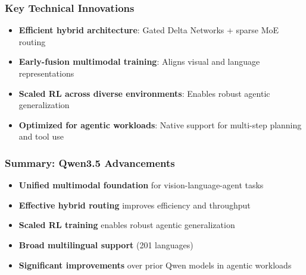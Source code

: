 \begin{frame}

\frametitle{Key Technical Innovations}

\begin{itemize}
\item \textbf{Efficient hybrid architecture}: Gated Delta Networks + sparse MoE routing
\item \textbf{Early-fusion multimodal training}: Aligns visual and language representations
\item \textbf{Scaled RL across diverse environments}: Enables robust agentic generalization
\item \textbf{Optimized for agentic workloads}: Native support for multi-step planning and tool use
\end{itemize}
\end{frame}%
\begin{frame}

\frametitle{Summary: Qwen3.5 Advancements}

\begin{itemize}
\item \textbf{Unified multimodal foundation} for vision-language-agent tasks
\item \textbf{Effective hybrid routing} improves efficiency and throughput
\item \textbf{Scaled RL training} enables robust agentic generalization
\item \textbf{Broad multilingual support} (201 languages)
\item \textbf{Significant improvements} over prior Qwen models in agentic workloads
\end{itemize}
\end{frame}